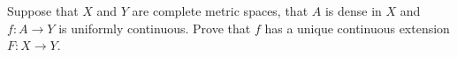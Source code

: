 Suppose that $X$ and $Y$ are complete metric spaces, that $A$ is dense
in $X$ and $f:A\rightarrow Y$ is uniformly continuous. Prove that $f$
has a unique continuous extension $F:X\rightarrow Y$.
